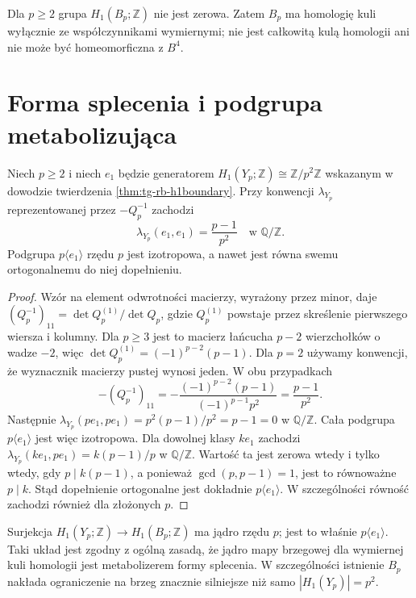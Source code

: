 \begin{uwaga}
Dla $p\geq2$ grupa $H_1(B_p;\mathbb Z)$
nie jest zerowa. Zatem $B_p$ ma homologię kuli
wyłącznie ze współczynnikami wymiernymi;
nie jest całkowitą kulą homologii ani
nie może być homeomorficzna z $B^4$.
\end{uwaga}

\section{Forma splecenia i podgrupa metabolizująca}
\label{sec:tg-rb-linkingform}

\begin{stwierdzenie}
\label{prop:tg-rb-linkingform}
Niech $p\geq2$ i niech $e_1$ będzie generatorem
$H_1(Y_p;\mathbb Z)\cong\mathbb Z/p^2\mathbb Z$
wskazanym w dowodzie twierdzenia
\ref{thm:tg-rb-h1boundary}. Przy konwencji
$\lambda_{Y_p}$ reprezentowanej przez $-Q_p^{-1}$
zachodzi
\[
\lambda_{Y_p}(e_1,e_1)=\frac{p-1}{p^2}
\quad\text{w }\mathbb Q/\mathbb Z.
\]
Podgrupa $p\langle e_1\rangle$ rzędu $p$ jest
izotropowa, a nawet jest równa swemu ortogonalnemu
do niej dopełnieniu.
\end{stwierdzenie}

\begin{proof}
Wzór na element odwrotności macierzy, wyrażony
przez minor, daje
$(Q_p^{-1})_{11}=\det Q_p^{(1)}/\det Q_p$,
gdzie $Q_p^{(1)}$ powstaje przez skreślenie pierwszego
wiersza i kolumny. Dla $p\geq3$ jest to
macierz łańcucha $p-2$ wierzchołków o wadze $-2$,
więc $\det Q_p^{(1)}=(-1)^{p-2}(p-1)$.
Dla $p=2$ używamy konwencji, że wyznacznik
macierzy pustej wynosi jeden. W obu przypadkach
\[
-(Q_p^{-1})_{11}=-\frac{(-1)^{p-2}(p-1)}{(-1)^{p-1}p^2}
=\frac{p-1}{p^2}.
\]
Następnie
$\lambda_{Y_p}(pe_1,pe_1)=p^2(p-1)/p^2=p-1=0$
w $\mathbb Q/\mathbb Z$. Cała podgrupa
$p\langle e_1\rangle$ jest więc izotropowa.
Dla dowolnej klasy $ke_1$ zachodzi
$\lambda_{Y_p}(ke_1,pe_1)=k(p-1)/p$
w $\mathbb Q/\mathbb Z$.
Wartość ta jest zerowa wtedy i tylko wtedy,
gdy $p\mid k(p-1)$, a ponieważ
$\gcd(p,p-1)=1$, jest to równoważne $p\mid k$.
Stąd dopełnienie ortogonalne jest dokładnie
$p\langle e_1\rangle$. W szczególności
równość zachodzi również dla złożonych $p$.
\end{proof}

\begin{uwaga}
Surjekcja $H_1(Y_p;\mathbb Z)\to H_1(B_p;\mathbb Z)$
ma jądro rzędu $p$; jest to właśnie
$p\langle e_1\rangle$.
Taki układ jest zgodny z ogólną zasadą,
że jądro mapy brzegowej dla wymiernej kuli homologii
jest metabolizerem formy splecenia.
W szczególności istnienie $B_p$ nakłada ograniczenie
na brzeg znacznie silniejsze niż samo $|H_1(Y_p)|=p^2$.
\end{uwaga}

